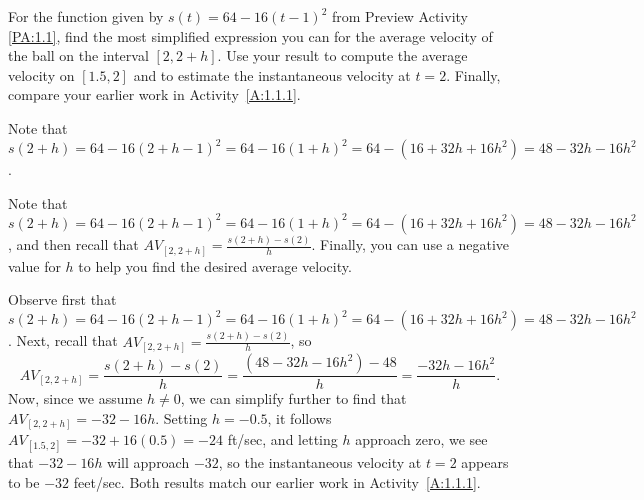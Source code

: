 \begin{activity} \label{A:1.1.3}
For the function given by $s(t) = 64 - 16(t-1)^2$ from Preview Activity \ref{PA:1.1}, find the most simplified expression you can for the average velocity of the ball on the interval $[2, 2+h]$.  Use your result to compute the average velocity on $[1.5,2]$ and to estimate the instantaneous velocity at $t = 2$.  Finally, compare your earlier work in Activity~\ref{A:1.1.1}.
\end{activity} 
\begin{smallhint}
Note that $s(2+h) = 64 - 16(2+h-1)^2 = 64 - 16(1+h)^2 = 64 - (16 + 32h + 16h^2) = 48 - 32h - 16h^2$.
\end{smallhint}
\begin{bighint}
Note that $s(2+h) = 64 - 16(2+h-1)^2 = 64 - 16(1+h)^2 = 64 - (16 + 32h + 16h^2) = 48 - 32h - 16h^2$, and then recall that $AV_{[2, 2+h]} = \frac{s(2+h) - s(2)}{h}$.  Finally, you can use a negative value for $h$ to help you find the desired average velocity.
\end{bighint}
\begin{activitySolution}
Observe first that $s(2+h) = 64 - 16(2+h-1)^2 = 64 - 16(1+h)^2 = 64 - (16 + 32h + 16h^2) = 48 - 32h - 16h^2$.  Next, recall that $AV_{[2, 2+h]} = \frac{s(2+h) - s(2)}{h}$, so
$$AV_{[2, 2+h]} = \frac{s(2+h) - s(2)}{h} = \frac{(48 - 32h - 16h^2)-48}{h} = \frac{-32h - 16h^2}{h}.$$
Now, since we assume $h \ne 0$, we can simplify further to find that $AV_{[2, 2+h]} = -32 - 16h$.  Setting $h = -0.5$, it follows $AV_{[1.5,2]} = -32 + 16(0.5) = -24$ ft/sec, and letting $h$ approach zero, we see that $-32 - 16h$ will approach $-32$, so the instantaneous velocity at $t = 2$ appears to be $-32$ feet/sec.  Both results match our earlier work in Activity~\ref{A:1.1.1}.
\end{activitySolution}
\aftera